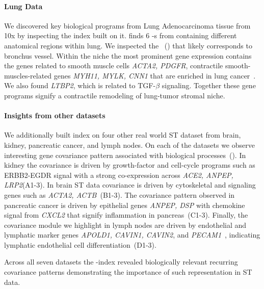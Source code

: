 \documentclass[pdflatex,sn-mathphys-num]{sn-jnl}%
\theoremstyle{thmstyleone}%
\theoremstyle{thmstyletwo}%
\theoremstyle{thmstylethree}%
\begin{document}
\paragraph{\textbf{Lung Data}} We discovered key biological programs from Lung Adenocarcinoma tissue from 10x by inspecting the \OurMethod index built on it. \OurMethod finds 6 \spdniche-s from containing different anatomical regions within lung. We inspected the ~() that likely corresponds to bronchus vessel. Within the niche the most prominent gene expression contains the genes related to smooth muscle cells \textit{ACTA2, PDGFR}, contractile smooth-muscles-related genes \textit{MYH11, MYLK, CNN1} that are enriched in lung cancer~\cite{nie2020clinical}. We also found \textit{LTBP2}, which is related to  TGF-$\beta$ signaling. Together these gene programs signify a contractile remodeling of lung-tumor stromal niche.   

\paragraph{\textbf{Insights from other datasets}} We additionally built \OurMethod index on four other real world ST dataset from brain, kidney, pancreatic cancer, and lymph nodes. On each of the datasets we observe interesting gene covariance pattern associated with biological processes~(). In kidney the covariance is driven by growth-factor and cell-cycle programs such as ERBB2-EGDR signal with a strong co-expression across \textit{ACE2, ANPEP, LRP2}(A1-3). In brain ST data covariance is driven by cytoskeletal and signaling genes such as \textit{ACTA2, ACTB~\cite{wang2023lpar2}}(B1-3). The covariance pattern observed in pancreatic cancer is driven by epithelial genes \textit{ANPEP, DSP} with chemokine signal from \textit{CXCL2} that signify inflammation in pancreas~(C1-3). Finally, the covariance module we highlight in lymph nodes are driven by endothelial and lymphatic marker genes \textit{APOLD1, CAVIN1, CAVIN2}, and \textit{PECAM1}~\cite{vockova2021cd31}, indicating lymphatic endothelial cell differentiation~(D1-3).

Across all seven datasets the \OurMethod-index revealed biologically relevant recurring covariance patterns demonstrating the importance of such representation in ST data. 
\end{document}
